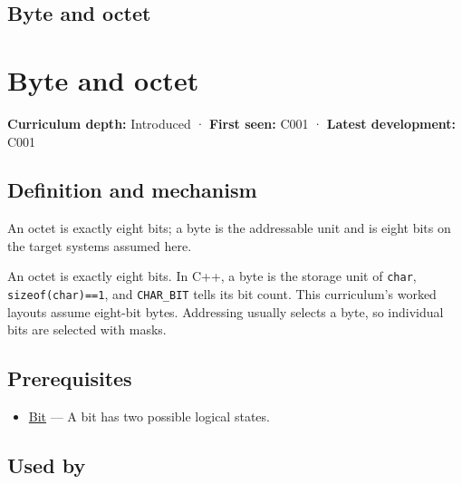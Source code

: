 \hypertarget{appendix-5bee2df85484}{}
\section*{Byte and octet}
\chapter{Byte and octet}\label{appendix-5bee2df85484-byte-and-octet}

\textbf{Curriculum depth:} Introduced · \textbf{First seen:} C001 · \textbf{Latest development:} C001

\section{Definition and mechanism}\label{appendix-5bee2df85484-definition-and-mechanism}

An octet is exactly eight bits; a byte is the addressable unit and is eight bits on the target systems assumed here.

An octet is exactly eight bits. In C++, a byte is the storage unit of \texttt{char}, \texttt{sizeof(char)==1}, and \texttt{CHAR\_BIT} tells its bit count. This curriculum's worked layouts assume eight-bit bytes. Addressing usually selects a byte, so individual bits are selected with masks.

\section{Prerequisites}\label{appendix-5bee2df85484-prerequisites}

\begin{itemize}
\tightlist
\item
  \hyperref[appendix-ddbb69998a2e]{Bit} --- A bit has two possible logical states.
\end{itemize}

\section{Used by}\label{appendix-5bee2df85484-used-by}

